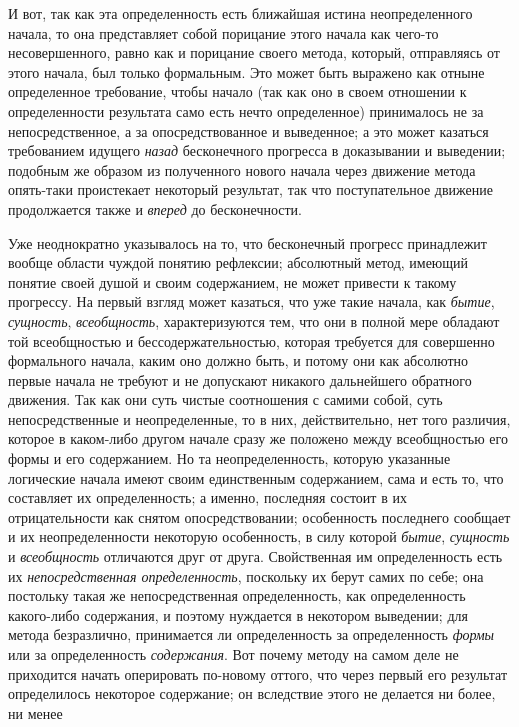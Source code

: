 И вот, так как эта определенность есть ближайшая истина
неопределенного начала, то она представляет собой порицание этого начала
как чего-то несовершенного, равно как и порицание своего метода, который,
отправляясь от этого начала, был только формальным. Это может быть выражено
как отныне определенное требование, чтобы начало (так как оно в своем
отношении к определенности результата само есть нечто определенное)
принималось не за непосредственное, а за опосредствованное и
выведенное; а это может казаться требованием идущего
{\em назад} бесконечного
прогресса в доказывании и выведении; подобным же образом из полученного
нового начала через движение метода опять-таки проистекает некоторый
результат, так что поступательное движение продолжается также и
{\em вперед} до бесконечности.

Уже неоднократно указывалось на то, что бесконечный прогресс
принадлежит вообще области чуждой понятию рефлексии; абсолютный метод,
имеющий понятие своей душой и своим содержанием, не может привести к такому
прогрессу. На первый взгляд может казаться, что уже такие начала, как
{\em бытие}, {\em сущность}, {\em всеобщность},
характеризуются тем, что они в полной мере обладают той
всеобщностью и бессодержательностью, которая требуется для совершенно
формального начала, каким оно должно быть, и потому они как абсолютно
первые начала не требуют и не допускают никакого дальнейшего обратного
движения. Так как они суть чистые соотношения с самими собой, суть
непосредственные и неопределенные, то в них, действительно, нет того
различия, которое в каком-либо другом начале сразу же положено между
всеобщностью его формы и его содержанием. Но та неопределенность, которую
указанные логические начала имеют своим единственным содержанием, сама и
есть то, что составляет их определенность; а именно, последняя состоит в их
отрицательности как снятом опосредствовании; особенность последнего
сообщает и их неопределенности некоторую особенность, в силу которой
{\em бытие}, {\em сущность} и {\em всеобщность}
отличаются друг от друга. Свойственная им определенность есть
их {\em непосредственная
определенность}, поскольку их берут самих по себе; она
постольку такая же непосредственная определенность, как определенность
какого-либо содержания, и поэтому нуждается в некотором выведении; для
метода безразлично, принимается ли определенность за определенность
{\em формы} или за определенность {\em содержания}.
Вот почему методу на самом деле не приходится начать
оперировать по-новому оттого, что через первый его результат определилось
некоторое содержание; он вследствие этого не делается ни более, ни менее
